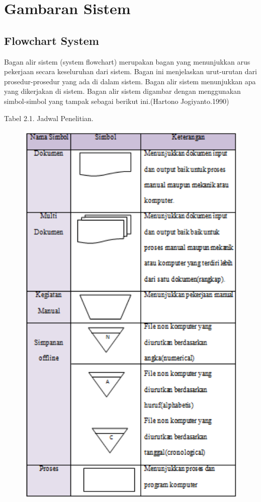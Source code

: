 \documentclass{jtetiproposalskripsi}
\begin{document}
\section{Gambaran Sistem}
\subsection{Flowchart System}
Bagan alir sistem (system flowchart) merupakan bagan yang menunjukkan arus pekerjaan secara keseluruhan dari sistem. Bagan ini menjelaskan urut-urutan dari prosedur-prosedur yang ada di dalam sistem. Bagan alir sistem menunjukkan apa yang dikerjakan di sistem. Bagan alir sistem digambar dengan menggunakan simbol-simbol yang tampak sebagai berikut ini.(Hartono Jogiyanto.1990)
\newpage
\begin{center}
Tabel 2.1. Jadwal Penelitian.
\end{center}
\vspace{-0.5cm}
\begin{figure}[ht!]
  \centering
    \includegraphics[width=12cm]{gambar/2}
\end{figure}
\end{document}

